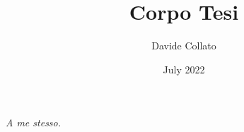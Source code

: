\documentclass[11pt, a4paper, oneside, openany]{book}
\title{Corpo Tesi}
\author{Davide Collato}
\date{July 2022}
\begin{document}

\thispagestyle{empty}



\phantom{}
\eject
\vspace*{\fill}
\begin{flushright}
\textit
{
A me stesso.
}
\end{flushright}
\thispagestyle{empty}

\phantom{}
\eject
\thispagestyle{empty}

\frontmatter


\thispagestyle{empty}

\tableofcontents
\newpage
\thispagestyle{empty}

\mainmatter




\thispagestyle{empty}
\backmatter



\end{document}

